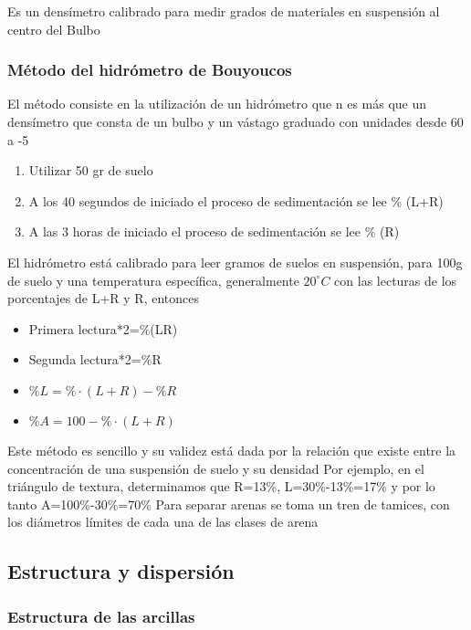 \begin{definition}[Hidrómetro]
    Es un densímetro calibrado para medir grados de materiales en suspensión al centro del Bulbo
\end{definition}

\subsubsection{Método del hidrómetro de Bouyoucos}
El método consiste en la utilización de un hidrómetro que n es más que un densímetro que consta de un bulbo y un vástago graduado con unidades desde 60 a -5
\begin{enumerate}
    \item Utilizar 50 gr de suelo
    \item A los 40 segundos de iniciado el proceso de sedimentación se lee \% (L+R)
    \item A las 3 horas de iniciado el proceso de sedimentación se lee \% (R)
\end{enumerate}
El hidrómetro está calibrado para leer gramos de suelos en suspensión, para 100g de suelo y una temperatura específica, generalmente $20^{\circ}C$ con las lecturas de los porcentajes de L+R y R, entonces
\begin{itemize}
    \item Primera lectura*2=\%(LR)
    \item Segunda lectura*2=\%R
    \item $\% L= \%\cdot (L+R)-\% R$
    \item $\% A= 100-\%\cdot (L+R)$
\end{itemize}
Este método es sencillo y su validez está dada por la relación que existe entre la concentración de una suspensión de suelo y su densidad
Por ejemplo, en el triángulo de textura, determinamos que R=13\%, L=30\%-13\%=17\% y por lo tanto A=100\%-30\%=70\%
Para separar arenas se toma un tren de tamices, con los diámetros límites de cada una de las clases de arena

\subsection{Estructura y dispersión}

\subsubsection{Estructura de las arcillas}

